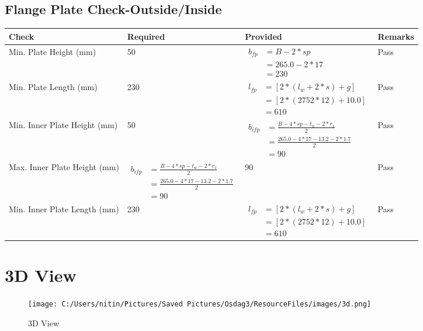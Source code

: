 \documentclass{article}%
\begin{document}
%
\newpage%
\subsection{Flange Plate Check{-}Outside/Inside}%
\label{subsec:FlangePlateCheck{-}Outside/Inside}%
\renewcommand{\arraystretch}{1.2}%
\begin{longtable}{|p{4cm}|p{6cm}|p{5.5cm}|p{1.5cm}|}%
\hline%
\rowcolor{OsdagGreen}%
Check&Required&Provided&Remarks\\%
\hline%
\endhead%
\hline%
Min. Plate Height (mm)&50&$\begin{aligned} b_{fp} &= {B - 2*sp} \\ &= {265.0 - 2 * 17} \\ &=230\end{aligned}$&Pass\\%
\hline%
Min. Plate Length (mm)&230&$\begin{aligned} l_{fp} & = [2*(l_{w} + 2*s) + g]\\ &= [2*(2752*12) +10.0]\\ &=610\end{aligned}$&Pass\\%
\hline%
Min. Inner Plate Height (mm)&50&$\begin{aligned} b_{ifp} &= \frac{B - 4*sp - t_w - 2*r_1}{2} \\ &= \frac{265.0- 4*17-13.2- 2*1.7} {2} \\ &=90\end{aligned}$&Pass\\%
\hline%
Max. Inner Plate Height (mm)&$\begin{aligned} b_{ifp} &= \frac{B - 4*sp - t_w - 2*r_1}{2} \\ &= \frac{265.0- 4*17-13.2- 2*1.7} {2} \\ &=90\end{aligned}$&90&Pass\\%
\hline%
Min. Inner Plate Length (mm)&230&$\begin{aligned} l_{fp} & = [2*(l_{w} + 2*s) + g]\\ &= [2*(2752*12) +10.0]\\ &=610\end{aligned}$&Pass\\%
\hline%
\end{longtable}

%
%
\newpage%
\section{3D View}%
\label{sec:3DView}%


\begin{figure}[h!]%
\centering%
\texttt{[image: C:/Users/nitin/Pictures/Saved Pictures/Osdag3/ResourceFiles/images/3d.png]}%
\caption{3D View}%
\end{figure}

%
\end{document}
